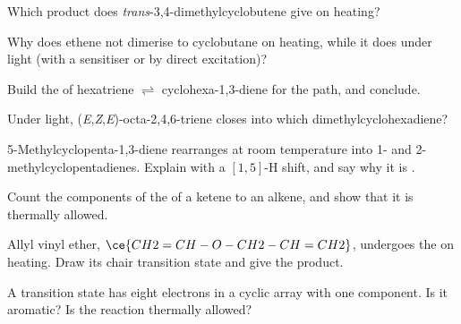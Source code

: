 \begin{exercise}[$\star$]\label{exo:b3:pericyclic:3}
Which product does \textit{trans}-3,4-dimethylcyclobutene give on heating?
\end{exercise}

\begin{exercise}[$\star$]\label{exo:b3:pericyclic:4}
Why does ethene not dimerise to cyclobutane on heating, while it does under light
(with a sensitiser or by direct excitation)?
\end{exercise}

\begin{exercise}[$\star\star$]\label{exo:b3:pericyclic:5}
Build the  of hexatriene $\rightleftharpoons$ cyclohexa-1,3-diene for the
 path, and conclude.
\end{exercise}

\begin{exercise}[$\star\star$]\label{exo:b3:pericyclic:6}
Under light, (\textit{E},\textit{Z},\textit{E})-octa-2,4,6-triene closes into which dimethylcyclohexadiene?
\end{exercise}

\begin{exercise}[$\star\star$]\label{exo:b3:pericyclic:7}
5-Methylcyclopenta-1,3-diene rearranges at room temperature into 1- and
2-methylcyclopentadienes. Explain with a $[1,5]$-H shift, and say why it is .
\end{exercise}

\begin{exercise}[$\star\star$]\label{exo:b3:pericyclic:8}
Count the components of the  of a ketene to an alkene, and show
that it is thermally allowed.
\end{exercise}

\begin{exercise}[$\star\star$]\label{exo:b3:pericyclic:9}
Allyl vinyl ether, $\ce{CH2=CH-O-CH2-CH=CH2}$, undergoes the  on
heating. Draw its chair transition state and give the product.
\end{exercise}

\begin{exercise}[$\star\star\star$]\label{exo:b3:pericyclic:10}
A transition state has eight electrons in a cyclic array with one 
component. Is it aromatic? Is the reaction thermally allowed?
\end{exercise}

